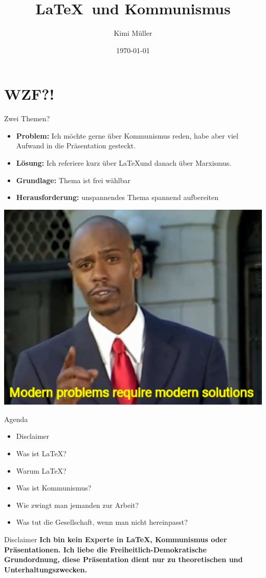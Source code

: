 \documentclass{beamer}
\title{\LaTeX \  und Kommunismus}
\date{\today}
\author{Kimi Müller}
\begin{document}
  \maketitle
  \section{WZF?!}
  \begin{frame}{Zwei Themen?}
    \begin{itemize}
        \item<1-> \textbf{Problem:} Ich möchte gerne über Kommunismus reden, habe aber viel Aufwand in die Präsentation gesteckt.
        \item<2-> \textbf{Lösung:} Ich referiere kurz über \LaTeX und danach über Marxismus.
        \item<3-> \textbf{Grundlage:} Thema ist frei wählbar
        \item<4-> \textbf{Herausforderung:} unspannendes Thema spannend aufbereiten
    \end{itemize}
  \end{frame}
  \begin{frame}
    \includegraphics[width=\textwidth]{Modern_Problems_Require_Modern_Solutions.jpg}
  \end{frame}
  \begin{frame}{Agenda}
\begin{itemize}
    \item Disclaimer
    \item Was ist \LaTeX?
    \item Warum \LaTeX?
    \item Was ist Kommunismus?
    \item Wie zwingt man jemanden zur Arbeit?
    \item Was tut die Gesellschaft, wenn man nicht hereinpasst?
\end{itemize}
  \end{frame}
  \begin{frame}{Disclaimer}
\textbf{Ich bin kein Experte in \LaTeX, Kommunismus oder Präsentationen. Ich liebe die Freiheitlich-Demokratische Grundordnung, diese Präsentation dient nur zu theoretischen und Unterhaltungszwecken.}
\end{frame}
\end{document}
